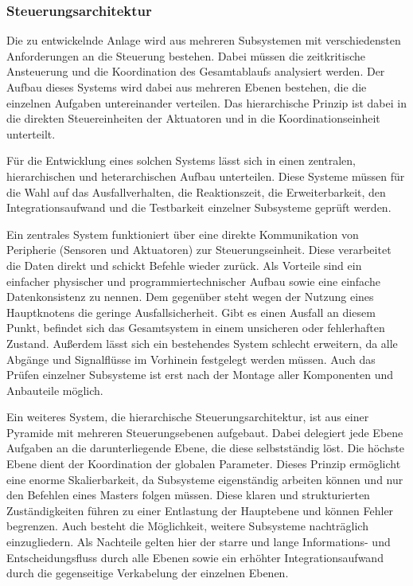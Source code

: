 \subsubsection{Steuerungsarchitektur}\label{sec:Steuerungsarchitektur}
Die zu entwickelnde Anlage wird aus mehreren Subsystemen mit verschiedensten Anforderungen an die Steuerung bestehen. Dabei müssen die zeitkritische
Ansteuerung und die Koordination des Gesamtablaufs analysiert werden. Der Aufbau dieses Systems wird dabei aus mehreren Ebenen bestehen,
die die einzelnen Aufgaben untereinander verteilen. Das hierarchische Prinzip ist dabei in die direkten Steuereinheiten der Aktuatoren
und in die Koordinationseinheit unterteilt.

Für die Entwicklung eines solchen Systems lässt sich in einen zentralen, hierarchischen und heterarchischen Aufbau unterteilen.
Diese Systeme müssen für die Wahl auf das Ausfallverhalten, die Reaktionszeit, die Erweiterbarkeit, den Integrationsaufwand und
die Testbarkeit einzelner Subsysteme geprüft werden.

Ein zentrales System funktioniert über eine direkte Kommunikation von Peripherie (Sensoren und Aktuatoren) zur Steuerungseinheit.
Diese verarbeitet die Daten direkt und schickt Befehle wieder zurück. Als Vorteile sind ein einfacher physischer und programmiertechnischer
Aufbau sowie eine einfache Datenkonsistenz zu nennen. Dem gegenüber steht wegen der Nutzung eines Hauptknotens die geringe Ausfallsicherheit.
Gibt es einen Ausfall an diesem Punkt, befindet sich das Gesamtsystem in einem unsicheren oder fehlerhaften Zustand. Außerdem
lässt sich ein bestehendes System schlecht erweitern, da alle Abgänge und Signalflüsse im Vorhinein festgelegt werden müssen.
Auch das Prüfen einzelner Subsysteme ist erst nach der Montage aller Komponenten und Anbauteile möglich.

Ein weiteres System, die hierarchische Steuerungsarchitektur, ist aus einer Pyramide mit mehreren Steuerungsebenen aufgebaut. Dabei
delegiert jede Ebene Aufgaben an die darunterliegende Ebene, die diese selbstständig löst. Die höchste
Ebene dient der Koordination der globalen Parameter. Dieses Prinzip ermöglicht eine enorme Skalierbarkeit,
da Subsysteme eigenständig arbeiten können und nur den Befehlen eines Masters folgen müssen. Diese klaren und strukturierten
Zuständigkeiten führen zu einer Entlastung der Hauptebene und können Fehler begrenzen. Auch besteht die Möglichkeit, weitere
Subsysteme nachträglich einzugliedern. Als Nachteile gelten hier der starre und lange Informations- und Entscheidungsfluss
durch alle Ebenen sowie ein erhöhter Integrationsaufwand durch die gegenseitige Verkabelung der einzelnen Ebenen.

